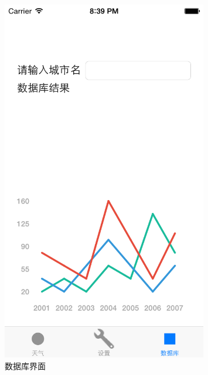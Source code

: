 \documentclass[UTF8,nofonts]{ctexart}
\begin{document}
\begin{figure}[hbt]
\centering
\includegraphics[width=0.8\textwidth]{7.png}
\caption{数据库界面}
\end{figure}
\end{document}
